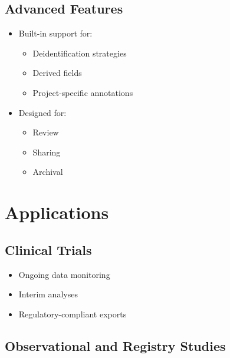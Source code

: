 \subsection{Advanced Features}\label{advanced-features}

\begin{itemize}
\tightlist
\item
  Built-in support for:

  \begin{itemize}
  \tightlist
  \item
    Deidentification strategies\\
  \item
    Derived fields\\
  \item
    Project-specific annotations\\
  \end{itemize}
\item
  Designed for:

  \begin{itemize}
  \tightlist
  \item
    Review\\
  \item
    Sharing\\
  \item
    Archival
  \end{itemize}
\end{itemize}

\section{Applications}\label{applications}

\subsection{Clinical Trials}\label{clinical-trials}

\begin{itemize}
\tightlist
\item
  Ongoing data monitoring\\
\item
  Interim analyses\\
\item
  Regulatory-compliant exports
\end{itemize}

\subsection{Observational and Registry Studies}\label{observational-and-registry-studies}

